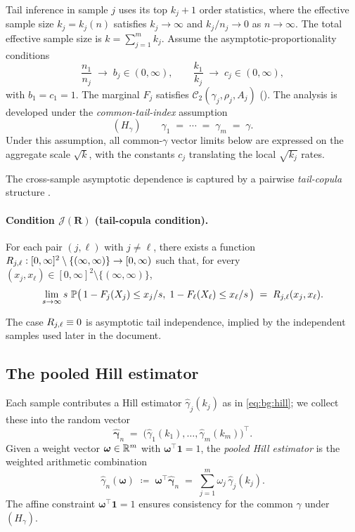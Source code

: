 Tail inference in sample $j$ uses its top $k_{j} + 1$ order statistics,
where the effective sample size $k_{j} = k_{j}(n)$ satisfies
$k_{j} \to \infty$ and $k_{j} / n_{j} \to 0$ as $n \to \infty$. The
total effective sample size is $k = \sum_{j=1}^{m} k_{j}$. Assume the
asymptotic-proportionality conditions
\begin{equation}
\label{eq:bg:pool-rates}
  \frac{n_{1}}{n_{j}} \;\to\; b_{j} \in (0, \infty),
  \qquad
  \frac{k_{1}}{k_{j}} \;\to\; c_{j} \in (0, \infty),
\end{equation}
with $b_{1} = c_{1} = 1$. The marginal $F_{j}$ satisfies
$\mathcal C_{2}(\gamma_{j}, \rho_{j}, A_{j})$
(). The analysis is developed under the
\emph{common-tail-index} assumption
\[
  (H_{\gamma}) \qquad
  \gamma_{1} \;=\; \cdots \;=\; \gamma_{m} \;=\; \gamma.
\]
Under this assumption, all common-$\gamma$ vector limits below are
expressed on the aggregate scale $\sqrt{k}$, with the constants $c_j$
translating the local $\sqrt{k_j}$ rates.

The cross-sample asymptotic dependence is captured by a pairwise
\emph{tail-copula} structure
\parencite[\S2.1]{DaouiaPadoanStupfler2021}.

\paragraph{Condition $\mathcal J(\bm R)$ (tail-copula condition).}
For each pair $(j, \ell)$ with $j \ne \ell$, there exists a function
$R_{j,\ell} : [0, \infty]^{2} \setminus \{(\infty, \infty)\} \to [0, \infty)$
such that, for every
$(x_{j}, x_{\ell}) \in [0, \infty]^{2} \setminus \{(\infty,\infty)\}$,
\[
  \lim_{s \to \infty}
    s\, \operatorname{\mathbb{P}}\!\big(\,
      1 - F_{j}(X_{j}) \le x_{j}/s,\;
      1 - F_{\ell}(X_{\ell}) \le x_{\ell}/s\,\big)
  \;=\; R_{j,\ell}(x_{j}, x_{\ell}).
\]

The case $R_{j,\ell} \equiv 0$ is asymptotic tail independence, implied by the
independent samples used later in the document.

\subsection{The pooled Hill estimator}

Each sample contributes a Hill estimator $\hat\gamma_{j}(k_{j})$ as
in \eqref{eq:bg:hill}; we collect these into the random vector
\[
  \hat{\bm\gamma}_{n}
  \;=\;
  \big(\hat\gamma_{1}(k_{1}), \ldots, \hat\gamma_{m}(k_{m})\big)^{\top}.
\]
Given a weight vector $\bm\omega \in \mathbb{R}^{m}$ with $\bm\omega^{\top}
\bm 1 = 1$, the \emph{pooled Hill estimator} is the weighted arithmetic
combination
\begin{equation}
\label{eq:bg:pooled-hill}
  \hat\gamma_{n}(\bm\omega)
  \;\coloneqq\;
  \bm\omega^{\top}\hat{\bm\gamma}_{n}
  \;=\;
  \sum_{j=1}^{m} \omega_{j}\,\hat\gamma_{j}(k_{j}).
\end{equation}
The affine constraint $\bm\omega^\top\bm 1=1$ ensures consistency for the
common $\gamma$ under $(H_\gamma)$.

